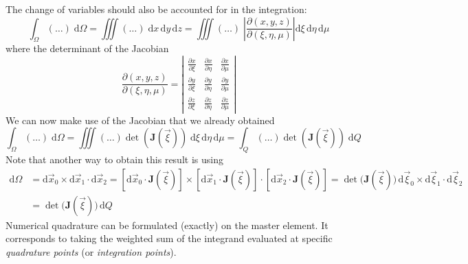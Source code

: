 \documentclass[times,namecite]{goose-article}
\begin{document}
The change of variables should also be accounted for in the integration:
\begin{equation}
  \int_\Omega (\ldots) \; \mathrm{d} \Omega
  =
  \iiint (\ldots) \; \mathrm{d} x \, \mathrm{d} y \, \mathrm{d} z
  =
  \iiint (\ldots) \; \left| \frac{\partial \left( x, y, z \right)}{\partial \left( \xi, \eta, \mu \right)} \right| \mathrm{d} \xi \, \mathrm{d} \eta \, \mathrm{d} \mu
\end{equation}
where the determinant of the Jacobian
\begin{equation}
  \frac{\partial \left( x, y, z \right)}{\partial \left( \xi, \eta, \mu \right)}
  =
  \left|
    \begin{array}{ccc}
      \displaystyle \frac{\partial x}{\partial \xi } &
      \displaystyle \frac{\partial x}{\partial \eta} &
      \displaystyle \frac{\partial x}{\partial \mu }
      \\
      \displaystyle \frac{\partial y}{\partial \xi } &
      \displaystyle \frac{\partial y}{\partial \eta} &
      \displaystyle \frac{\partial y}{\partial \mu }
      \\
      \displaystyle \frac{\partial z}{\partial \xi } &
      \displaystyle \frac{\partial z}{\partial \eta} &
      \displaystyle \frac{\partial z}{\partial \mu }
    \end{array}
  \right|
\end{equation}
We can now make use of the Jacobian that we already obtained
\begin{equation}
  \int_\Omega (\ldots) \; \mathrm{d} \Omega
  =
  \iiint (\ldots) \det \left( \bm{J}(\vec{\xi}) \right) \; \mathrm{d} \xi \, \mathrm{d} \eta \, \mathrm{d} \mu
  =
  \int_Q (\ldots) \det \left( \bm{J}(\vec{\xi}) \right) \; \mathrm{d} Q
\end{equation}
Note that another way to obtain this result is using
\begin{align}
  \mathrm{d} \Omega
  &=
  \mathrm{d} \vec{x}_0 \times \mathrm{d} \vec{x}_1 \cdot \mathrm{d} \vec{x}_2
  =
  \left[ \mathrm{d} \vec{x}_0 \cdot \bm{J}(\vec{\xi}) \right] \times
  \left[ \mathrm{d} \vec{x}_1 \cdot \bm{J}(\vec{\xi}) \right] \cdot
  \left[ \mathrm{d} \vec{x}_2 \cdot \bm{J}(\vec{\xi}) \right]
  =
  \det \big( \bm{J}(\vec{\xi}) \big)\,
  \mathrm{d} \vec{\xi}_0 \times \mathrm{d} \vec{\xi}_1 \cdot \mathrm{d} \vec{\xi}_2
  \\
  &=
  \det \big( \bm{J}(\vec{\xi}) \big)\, \mathrm{d} Q
\end{align}
Numerical quadrature can be formulated (exactly) on the master element. It corresponds to taking the weighted sum of the integrand evaluated at specific \emph{quadrature points} (or \emph{integration points}).
\end{document}
